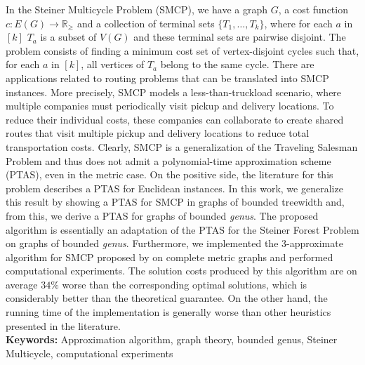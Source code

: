 
In the Steiner Multicycle Problem (SMCP), we have a graph \(G\), a cost function $c \colon E(G) \to \mathbb{R}_\ge$ and a collection of terminal sets \(\{T_1, \dots , T_k\}\), where for each \(a\) in \([k]\) \(T_a\) is a subset of \(V(G)\) and these terminal sets are pairwise disjoint. The problem consists of finding a minimum cost set of vertex-disjoint cycles such that, for each \(a\) in \([k]\), all vertices of \(T_a\) belong to the same cycle.
There are applications related to routing problems that can be translated into SMCP instances.
More precisely, SMCP models a less-than-truckload scenario, where multiple companies must periodically visit pickup and delivery locations.
To reduce their individual costs, these companies can collaborate to create shared routes that visit multiple pickup and delivery locations to reduce total transportation costs.
Clearly, SMCP is a generalization of the Traveling Salesman Problem and thus does not admit a polynomial-time approximation scheme (PTAS), even in the metric case.
On the positive side, the literature for this problem describes a PTAS for Euclidean instances. In this work, we generalize this result by showing a PTAS for SMCP in graphs of bounded treewidth and, from this, we derive a PTAS for graphs of bounded \textit{genus}.
The proposed algorithm is essentially an adaptation of the PTAS for the Steiner Forest Problem on graphs of bounded \textit{genus}.
Furthermore, we implemented the 3-approximate algorithm for SMCP proposed by \cite{smcp_3apx} on complete metric graphs and performed computational experiments.
The solution costs produced by this algorithm are on average \(34\%\) worse than the corresponding optimal solutions, which is considerably better than the theoretical guarantee.
On the other hand, the running time of the implementation is generally worse than other heuristics presented in the literature.
\hfill\\

\noindent\textbf{Keywords:} Approximation algorithm, graph theory, bounded genus, Steiner Multicycle, computational experiments
